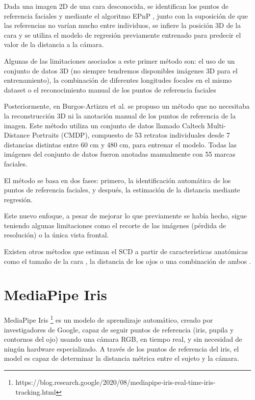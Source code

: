 Dada una imagen 2D de una cara desconocida, se identifican los puntos de referencia faciales y mediante el algoritmo EPnP \cite{29}, junto con la suposición de que las referencias no varían mucho entre individuos, se infiere la posición 3D de la cara y se utiliza el modelo de regresión previamente entrenado para predecir el valor de la distancia a la cámara.

Algunas de las limitaciones asociados a este primer método son: el uso de un conjunto de datos 3D (no siempre tendremos disponibles imágenes 3D para el entrenamiento), la combinación de diferentes longitudes focales en el mismo dataset o el reconocimiento manual de los puntos de referencia faciales

Posteriormente, en Burgos-Artizzu et al. \cite{30} se propuso un método que no necesitaba la reconstrucción 3D ni la anotación manual de los puntos de referencia de la imagen. Este método utiliza un conjunto de datos llamado Caltech Multi-Distance Portraits (CMDP), compuesto de 53 retratos individuales desde 7 distancias distintas entre 60 cm y 480 cm, para entrenar el modelo. Todas las imágenes del conjunto de datos fueron anotadas manualmente con 55 marcas faciales. 

El método se basa en dos fases: primero, la identificación automática de los puntos de referencia faciales, y después, la estimación de la distancia mediante regresión.

Este nuevo enfoque, a pesar de mejorar lo que previamente se había hecho, sigue teniendo algunas limitaciones como el recorte de las imágenes (pérdida de resolución) o la única vista frontal.

Existen otros métodos que estiman el SCD a partir de características anatómicas como el tamaño de la cara \cite{32}, la distancia de los ojos \cite{33} o una combinación de ambos \cite{34}.

\section{MediaPipe Iris}

MediaPipe Iris \footnote{https://blog.research.google/2020/08/mediapipe-iris-real-time-iris-tracking.html} es un modelo de aprendizaje automático, creado por investigadores de Google, capaz de seguir puntos de referencia (iris, pupila y contornos del ojo) usando una cámara RGB, en tiempo real, y sin necesidad de ningún hardware especializado. A través de los puntos de referencia del iris, el model es capaz de determinar la distancia métrica entre el sujeto y la cámara.

